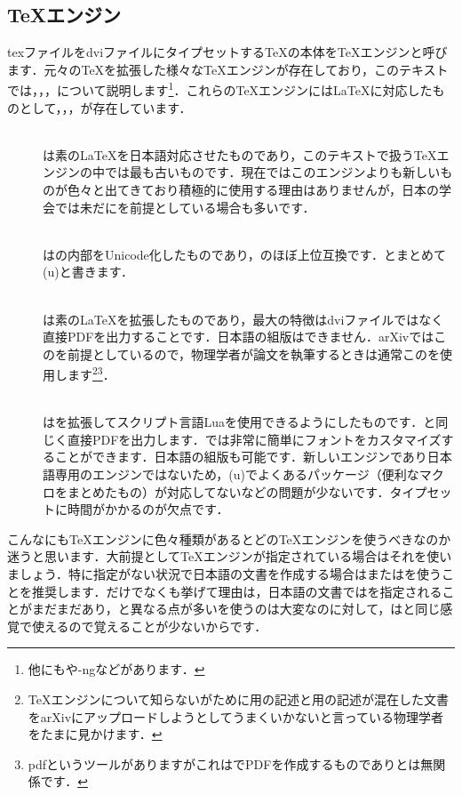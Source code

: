 \subsection{\TeX エンジン}
texファイルをdviファイルにタイプセットする\TeX の本体を\TeX エンジンと呼びます．元々の\TeX を拡張した様々な\TeX エンジンが存在しており，このテキストでは\pTeX ，\upTeX ，\pdfTeX ，\LuaTeX について説明します\footnote{他にも\XeTeX や\pTeX-ngなどがあります．}．これらの\TeX エンジンには\LaTeX に対応したものとして\pLaTeX ，\upLaTeX ，\pdfLaTeX ，\LuaLaTeX が存在しています．
\begin{description}
	\item[\pLaTeX] \mbox{}\\
		\pLaTeX は素の\LaTeX を日本語対応させたものであり，このテキストで扱う\TeX エンジンの中では最も古いものです．現在ではこのエンジンよりも新しいものが色々と出てきており積極的に使用する理由はありませんが，日本の学会では未だに\pLaTeX を前提としている場合も多いです．
	\item[\upLaTeX] \mbox{}\\
		\upLaTeX は\pLaTeX の内部をUnicode化したものであり，\pLaTeX のほぼ上位互換です．\pLaTeX とまとめて(u)\pLaTeX と書きます．
	\item[\pdfLaTeX] \mbox{}\\
		\pdfLaTeX は素の\LaTeX を拡張したものであり，最大の特徴はdviファイルではなく直接PDFを出力することです．日本語の組版はできません．arXivではこの\pdfLaTeX を前提としているので，物理学者が論文を執筆するときは通常この\pdfLaTeX を使用します\footnote{\TeX エンジンについて知らないがために\pdfLaTeX 用の記述と\pLaTeX 用の記述が混在した文書をarXivにアップロードしようとしてうまくいかないと言っている物理学者をたまに見かけます．}\footnote{pdf\pLaTeX というツールがありますがこれは\pLaTeX でPDFを作成するものであり\pdfLaTeX とは無関係です．}．
	\item[\LuaLaTeX] \mbox{}\\
		\LuaLaTeX は\pdfLaTeX を拡張してスクリプト言語Luaを使用できるようにしたものです．\pdfLaTeX と同じく直接PDFを出力します．\LuaLaTeX では非常に簡単にフォントをカスタマイズすることができます．日本語の組版も可能です．新しいエンジンであり日本語専用のエンジンではないため，(u)\pLaTeX でよくあるパッケージ（便利なマクロをまとめたもの）が対応してないなどの問題が少ないです．タイプセットに時間がかかるのが欠点です．
\end{description}

こんなにも\TeX エンジンに色々種類があるとどの\TeX エンジンを使うべきなのか迷うと思います．大前提として\TeX エンジンが指定されている場合はそれを使いましょう．特に指定がない状況で日本語の文書を作成する場合は\upLaTeX または\LuaLaTeX を使うことを推奨します．\LuaLaTeX だけでなく\upLaTeX も挙げて理由は，日本語の文書では\pLaTeX を指定されることがまだまだあり，\pLaTeX と異なる点が多い\LuaLaTeX を使うのは大変なのに対して，\upLaTeX は\pLaTeX と同じ感覚で使えるので覚えることが少ないからです．